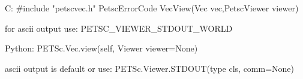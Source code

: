 C:
#include "petscvec.h"
PetscErrorCode  VecView(Vec vec,PetscViewer viewer)

for ascii output use:
PETSC_VIEWER_STDOUT_WORLD

Python:
PETSc.Vec.view(self, Viewer viewer=None)

ascii output is default or use:
PETSc.Viewer.STDOUT(type cls, comm=None)
